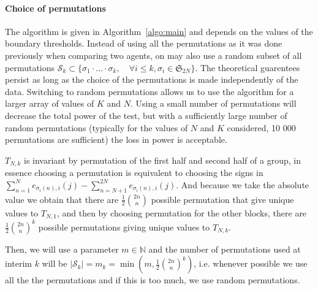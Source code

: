 \documentclass{article}
\theoremstyle{plain}
\theoremstyle{remark}
\renewcommand{\S}{\mathfrak{S}}
\newcommand{\1}{\mathbbm{1}}
\numberwithin{equation}{section}
\begin{document}
\paragraph{Choice of permutations}
The algorithm is given in Algorithm~\ref{algo:main} and depends on the values of the boundary thresholds. 
Instead of using all the permutations as it was done previously when comparing two agents, on may also use a random  subset of all permutations $\mathcal{S}_k \subset \{\sigma_1 \cdot \ldots \cdot \sigma_k,\quad \forall i \le k, \sigma_i \in \S_{2N}\}$. The theoretical guarentees persist as long as the choice of the permutations is made independently of the data. Switching to random permutations allows us to use the algorithm for a larger array of values of $K$ and $N$. Using a small number of permutations will decrease the total power of the test, but with a sufficiently large number of random permutations (typically for the values of $N$ and $K$ considered, 10 000 permutations are sufficient) the loss in power is acceptable. 

$T_{N,k}$ is invariant by permutation of the first half and second half of a group, in essence choosing a permutation is equivalent to choosing the signs in $\sum_{n=1}^{N} e_{\sigma_i(n),i}(j)-\sum_{n=N+1}^{2N} e_{\sigma_i(n),i}(j)$. And because we take the absolute value we obtain that there are $\frac{1}{2} {2n \choose n}$ possible permutation that give unique values to $T_{N,1}$, and then by choosing permutation for the other blocks, there are $\frac{1}{2} {2n \choose n}^k$ possible permutations giving unique values to $T_{N,k}$.

Then, we will use a parameter $m\in \mathbb{N}$ and the number of permutations used at interim $k$ will be $|\mathcal{S}_k|=m_k=\min\left(m, \frac{1}{2} {2n \choose n}^k\right)$, i.e. whenever possible we use all the the permutations and if this is too much, we use random permutations.
\end{document}
